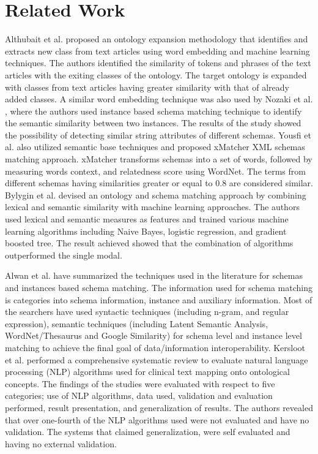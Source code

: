 
\section*{Related Work}
Althubait et al. \cite{althubaiti2020combining} proposed an ontology expansion methodology that identifies and extracts new class from text articles using word embedding and machine learning techniques. The authors identified the similarity of tokens and phrases of the text articles with the exiting classes of the ontology. The target ontology is expanded with classes from text articles having greater similarity with that of already added classes. A similar word embedding technique was also used by Nozaki et al. \cite{nozaki2019semantic}, where the authors used instance based schema matching technique to identify the semantic similarity between two instances. The results of the study showed the possibility of detecting similar string attributes of different schemas. Yousfi et al. \cite{yousfi2020xmatcher} also utilized semantic base techniques and proposed xMatcher XML schemas matching approach. xMatcher transforms schemas into a set of words, followed by measuring words context, and relatedness score using WordNet. The terms from different schemas having similarities greater or equal to 0.8 are considered similar. 
Bylygin et al. \cite{bulygin2018combining} devised an ontology and schema matching approach by combining lexical and semantic similarity with machine learning approaches.  The authors used lexical and semantic measures as features and trained various machine learning algorithms including Naive Bayes, logistic regression, and gradient boosted tree. The result achieved showed that the combination of algorithms outperformed the single modal. 

Alwan et al. \cite{alwan2017survey} have summarized the techniques used in the literature for schemas and instances based schema matching. The information used for schema matching is categories into  schema information, instance and auxiliary information. Most of the searchers have used syntactic techniques (including n-gram, and regular expression), semantic techniques (including Latent Semantic Analysis, WordNet/Thesaurus and Google Similarity) for schema level and instance level matching to achieve the final goal of data/information interoperability.  Kersloot et al. \cite{kersloot2020natural} performed a comprehensive systematic review to evaluate natural language processing (NLP) algorithms used for clinical text mapping onto ontological concepts. The findings of the studies were evaluated with respect to five categories; use of NLP algorithms, data used, validation and evaluation performed, result presentation, and generalization of results. The authors revealed that over one-fourth of the NLP algorithms used were not evaluated and have no validation. The systems that claimed generalization, were self evaluated and having no external validation.  
